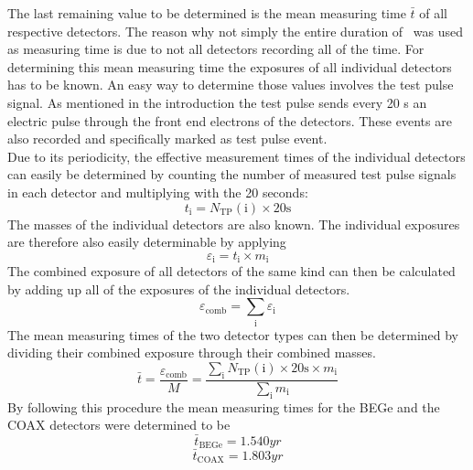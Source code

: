 \documentclass[encoding=utf8,british]{tumphthesis}
\begin{document}
The last remaining value to be determined is the mean measuring time $\bar{t}$ of all respective detectors.
The reason why not simply the entire duration of \PII\ was used as measuring time is due to not all detectors recording all of the time.
For determining this mean measuring time the exposures of all individual detectors has to be known.
An easy way to determine those values involves the test pulse signal.
As mentioned in the introduction the test pulse sends every 20 s an electric pulse through the front end electrons of the detectors.
These events are also recorded and specifically marked as test pulse event. 
\\

Due to its periodicity, the effective measurement times of the individual detectors can easily be determined by counting the number of measured test pulse signals in each detector and multiplying with the 20 seconds:
\begin{equation}
    t_\mathrm{i} = N_{\mathrm{TP}}(\mathrm{i}) \times 20\mathrm{s}
\end{equation}
The masses of the individual detectors are also known.
The individual exposures are therefore also easily determinable by applying 
\begin{equation}
    \varepsilon_\mathrm{i} = t_\mathrm{i} \times m_\mathrm{i}
\end{equation}
The combined exposure of all detectors of the same kind can then be calculated by adding up all of the exposures of the individual detectors.  
\begin{equation}
    \varepsilon_{\mathrm{comb}} = \sum_\mathrm{i} \varepsilon_\mathrm{i}
\end{equation}
The mean measuring times of the two detector types can then be determined by dividing their combined exposure through their combined masses. 
\begin{equation}
    \bar{t} = \frac{\varepsilon_{\mathrm{comb}}}{M} = \frac{\sum_\mathrm{i} N_{\mathrm{TP}}(\mathrm{i}) \times 20\mathrm{s} \times m_\mathrm{i}}{\sum_\mathrm{i} m_\mathrm{i}}
\end{equation}
By following this procedure the mean measuring times for the BEGe and the COAX detectors were determined to be
\begin{equation*}
    \bar{t}_{\mathrm{BEGe}} = 1.540 \unit{yr}
\end{equation*}
\begin{equation*}
    \bar{t}_{\mathrm{COAX}} = 1.803 \unit{yr}
\end{equation*}
\end{document}
